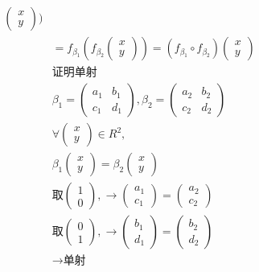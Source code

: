 \documentclass[12pt, a4paper]{article}  %
\begin{document}
\begin{align}
\begin{pmatrix}
        x\\
        y
    \end{pmatrix})\\
    &=f_{\beta_1}(f_{\beta_2}\begin{pmatrix}
        x\\
        y
    \end{pmatrix})=(f_{\beta_1} \circ f_{\beta_2})\begin{pmatrix}
        x\\
        y
    \end{pmatrix}\\
    &\text{证明单射}\\
    &\beta_1=\begin{pmatrix}
        a_1&b_1\\
        c_1&d_1
    \end{pmatrix},\beta_2=\begin{pmatrix}
        a_2&b_2\\
        c_2&d_2
    \end{pmatrix}\\
    &\forall \begin{pmatrix}
        x\\
        y
    \end{pmatrix}    \in R^2,\\
    &\beta_1\begin{pmatrix}
        x\\
        y
    \end{pmatrix}=\beta_2\begin{pmatrix}
        x\\
        y
    \end{pmatrix}\\
    &\text{取}\begin{pmatrix}
        1\\
        0
    \end{pmatrix},\rightarrow \begin{pmatrix}
        a_1\\
        c_1
    \end{pmatrix}=\begin{pmatrix}
        a_2\\
        c_2
    \end{pmatrix}\\
    &\text{取}\begin{pmatrix}
        0\\
        1
    \end{pmatrix},\rightarrow \begin{pmatrix}
        b_1\\
        d_1
    \end{pmatrix}=\begin{pmatrix}
        b_2\\
        d_2
    \end{pmatrix}\\
    &\rightarrow \text{单射}\\
\end{align}
\end{document}
